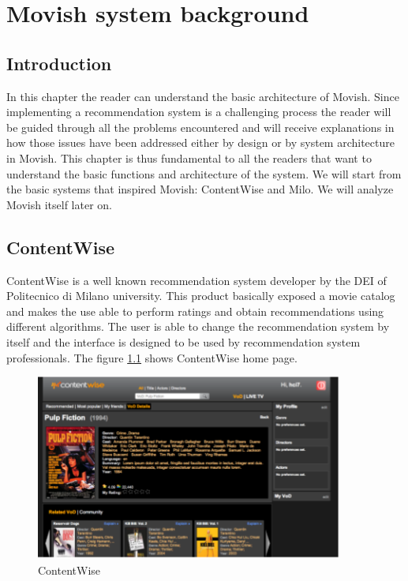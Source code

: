 \chapter{Movish system background}
\label{chapter:movish_system_background}

\section{Introduction}
\label{sec:movish_introduction}

In this chapter the reader can understand the basic architecture of Movish. Since implementing a recommendation system is a challenging process the reader will be guided through all the problems encountered and will receive explanations in how those issues have been addressed either by design or by system architecture in Movish. This chapter is thus fundamental to all the readers that want to understand the basic functions and architecture of the system.
We will start from the basic systems that inspired Movish: ContentWise and Milo. We will analyze Movish itself later on.

\section{ContentWise}
\label{sec:contentwise}

ContentWise is a well known recommendation system developer by the \ac{DEI} of Politecnico di Milano university. This product basically exposed a movie catalog and makes the use able to perform ratings and obtain recommendations using different algorithms. The user is able to change the recommendation system by itself and the interface is designed to be used by recommendation system professionals. The figure \ref{fig:contentwise} shows ContentWise home page.    

\begin{figure}
  \centering
  \includegraphics[width=0.9\textwidth]{figures/contentwise-homepage.png}
  \caption{ContentWise}
  \label{fig:contentwise}
\end{figure}

